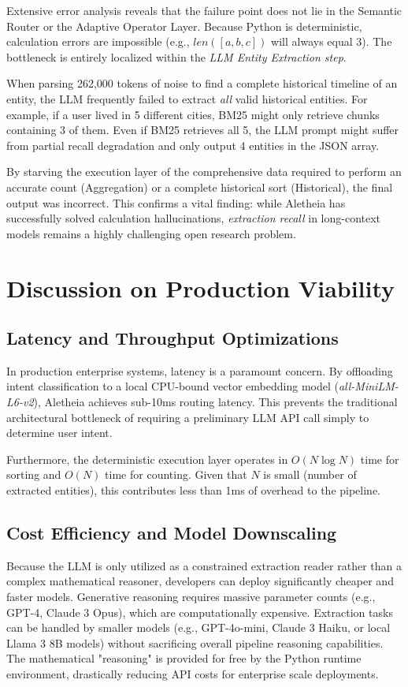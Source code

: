 \documentclass[journal,10pt]{IEEEtran}
\begin{document}
Extensive error analysis reveals that the failure point does not lie in the Semantic Router or the Adaptive Operator Layer. Because Python is deterministic, calculation errors are impossible (e.g., $len([a,b,c])$ will always equal 3). The bottleneck is entirely localized within the \textit{LLM Entity Extraction step}. 

When parsing 262,000 tokens of noise to find a complete historical timeline of an entity, the LLM frequently failed to extract \textit{all} valid historical entities. For example, if a user lived in 5 different cities, BM25 might only retrieve chunks containing 3 of them. Even if BM25 retrieves all 5, the LLM prompt might suffer from partial recall degradation and only output 4 entities in the JSON array. 

By starving the execution layer of the comprehensive data required to perform an accurate count (Aggregation) or a complete historical sort (Historical), the final output was incorrect. This confirms a vital finding: while Aletheia has successfully solved calculation hallucinations, \textit{extraction recall} in long-context models remains a highly challenging open research problem.

\section{Discussion on Production Viability}

\subsection{Latency and Throughput Optimizations}
In production enterprise systems, latency is a paramount concern. By offloading intent classification to a local CPU-bound vector embedding model (\textit{all-MiniLM-L6-v2}), Aletheia achieves sub-10ms routing latency. This prevents the traditional architectural bottleneck of requiring a preliminary LLM API call simply to determine user intent. 

Furthermore, the deterministic execution layer operates in $O(N \log N)$ time for sorting and $O(N)$ time for counting. Given that $N$ is small (number of extracted entities), this contributes less than 1ms of overhead to the pipeline.

\subsection{Cost Efficiency and Model Downscaling}
Because the LLM is only utilized as a constrained extraction reader rather than a complex mathematical reasoner, developers can deploy significantly cheaper and faster models. Generative reasoning requires massive parameter counts (e.g., GPT-4, Claude 3 Opus), which are computationally expensive. Extraction tasks can be handled by smaller models (e.g., GPT-4o-mini, Claude 3 Haiku, or local Llama 3 8B models) without sacrificing overall pipeline reasoning capabilities. The mathematical "reasoning" is provided for free by the Python runtime environment, drastically reducing API costs for enterprise scale deployments.
\end{document}

